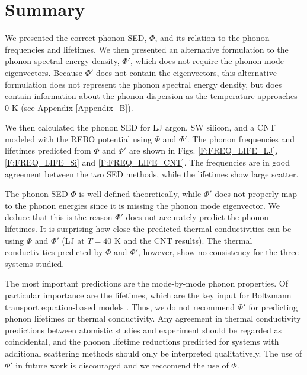 \section{\label{Section_Conclusions}Summary}
We presented the correct phonon SED, $\Phi$, and its relation to the phonon 
frequencies and lifetimes. 
We then presented an alternative formulation to the 
phonon spectral energy density, $\Phi'$, which does not require the phonon 
mode eigenvectors.  
Because $\Phi'$ does not contain the eigenvectors, this alternative 
formulation does not represent 
the phonon spectral energy density, but does contain information about 
the phonon dispersion as the 
temperature approaches $0$ K (see Appendix \ref{Appendix_B}).

We then calculated the phonon SED for LJ argon, SW silicon, and a CNT 
modeled with the REBO 
potential using $\Phi$ and $\Phi'$. The phonon frequencies and
lifetimes predicted from $\Phi$ and $\Phi'$ are shown in Figs$.$ 
\ref{F:FREQ_LIFE_LJ}, 
\ref{F:FREQ_LIFE_Si} and \ref{F:FREQ_LIFE_CNT}. The
frequencies are in good agreement between the two SED methods, while the 
lifetimes show large scatter.

The phonon SED $\Phi$ is well-defined theoretically, while $\Phi'$ does 
not properly map to the 
phonon energies since it is missing the phonon mode eigenvector. We deduce 
that this is the reason 
$\Phi'$ does not accurately predict the phonon lifetimes. It is surprising 
how close the predicted 
thermal conductivities can be using $\Phi$ and $\Phi'$ (LJ at $T=40$ K and 
the CNT results). The 
thermal conductivities predicted by $\Phi$ and $\Phi'$, however, show no 
consistency for the three 
systems studied.

The most important predictions are the mode-by-mode phonon properties. Of 
particular importance are 
the lifetimes, which are the key input for Boltzmann transport 
equation-based models 
\cite{mcgaughey_size-dependent_2011}. Thus, we do not recommend $\Phi'$ 
for predicting phonon lifetimes or 
thermal conductivity.  Any agreement in thermal conductivity predictions 
between atomistic 
studies\cite{thomas_predicting_2010} and experiment
\cite{koker_thermal_2009,qiu_molecular_2011} should 
be regarded as 
coincidental, and the phonon lifetime reductions predicted for systems 
with additional scattering 
methods \cite{thomas_predicting_2010,shiomi_thermal_2011} should only 
be interpreted qualitatively. The use of $\Phi'$ 
in future work is discouraged and we reccomend the use of $\Phi$.



